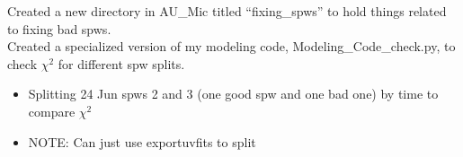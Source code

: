 \documentclass[a4paper]{tufte-handout}
\begin{document}
\hrulefill

Created a new directory in AU\_Mic titled ``fixing\_spws'' to hold things related to fixing bad spws.\\
\indent Created a specialized version of my modeling code, Modeling\_Code\_check.py, to check $\chi^2$ for different spw splits.

\begin{itemize}
	\item Splitting 24 Jun spws 2 and 3 (one good spw and one bad one) by time to compare $\chi^2$
	\item NOTE: Can just use exportuvfits to split
\end{itemize}



% 
% 
\end{document}
